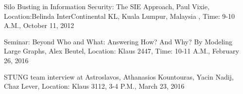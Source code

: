 \documentclass{acm_proc_article-sp}
\begin{document}
Silo Busting in Information Security: The SIE Approach, Paul Vixie, Location:Belinda InterContinental KL, Kuala Lumpur, Malaysia , Time: 9-10 A.M., October 11, 2012

Seminar: Beyond Who and What: Answering How? And Why? By Modeling Large Graphs, Alex Beutel, Location: Klaus 2447, Time: 10-11 A.M., February 26, 2016

STUNG team interview at Astroslavos, Athanasios Kountouras, Yacin Nadij, Chaz Lever, Location: Klaus 3112, 3-4 P.M., March 23, 2016


\paragraph{}




\end{document}
